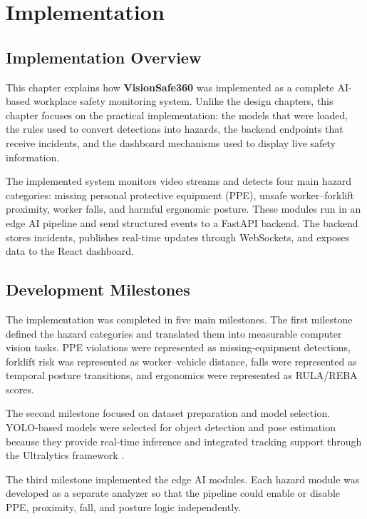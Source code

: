 \chapter{Implementation}

\section{Implementation Overview}

This chapter explains how \textbf{VisionSafe360} was implemented as a complete AI-based workplace safety monitoring system. Unlike the design chapters, this chapter focuses on the practical implementation: the models that were loaded, the rules used to convert detections into hazards, the backend endpoints that receive incidents, and the dashboard mechanisms used to display live safety information.

The implemented system monitors video streams and detects four main hazard categories: missing personal protective equipment (PPE), unsafe worker--forklift proximity, worker falls, and harmful ergonomic posture. These modules run in an edge AI pipeline and send structured events to a FastAPI backend. The backend stores incidents, publishes real-time updates through WebSockets, and exposes data to the React dashboard.

\section{Development Milestones}

The implementation was completed in five main milestones. The first milestone defined the hazard categories and translated them into measurable computer vision tasks. PPE violations were represented as missing-equipment detections, forklift risk was represented as worker--vehicle distance, falls were represented as temporal posture transitions, and ergonomics were represented as RULA/REBA scores.

The second milestone focused on dataset preparation and model selection. YOLO-based models were selected for object detection and pose estimation because they provide real-time inference and integrated tracking support through the Ultralytics framework \cite{ultralytics_yolov8}.

The third milestone implemented the edge AI modules. Each hazard module was developed as a separate analyzer so that the pipeline could enable or disable PPE, proximity, fall, and posture logic independently.

